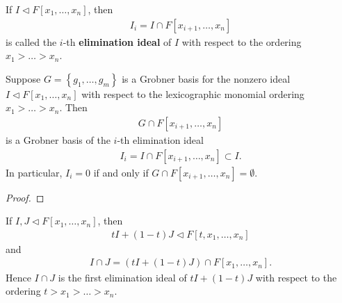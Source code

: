 \documentclass{memoir}
\begin{document}
\begin{defn}
	If \(I\triangleleft F[x_1,\ldots,x_n]\), then
	\begin{align*}
		I_i = I \cap F[x_{i+1},\ldots,x_n]
	\end{align*}
	is called the \(i\)-th \textbf{elimination ideal} of \(I\) with respect to the ordering \(x_1>\ldots>x_n\).
\end{defn}

\begin{prop}[Elimination]
	Suppose \(G = \left\{ g_1,\ldots,g_m \right\} \) is a Grobner basis for the nonzero ideal \(I \triangleleft F[x_1,\ldots,x_n]\) with respect to the lexicographic monomial ordering \(x_1>\ldots>x_n\). Then
	\begin{align*}
		G \cap F[x_{i+1},\ldots,x_n]
	\end{align*}
	is a Grobner basis of the \(i\)-th elimination ideal
	\begin{align*}
		I_i = I \cap F[x_{i+1},\ldots,x_n] \subset I.
	\end{align*}
	In particular, \(I_i = 0\) if and only if \(G \cap F[x_{i+1},\ldots,x_n] = \emptyset\).
\end{prop}
\begin{proof}
	
\end{proof}

\begin{exmp}
		
\end{exmp}

\begin{prop}
	If \(I,J \triangleleft F[x_1,\ldots,x_n]\), then
	\begin{align*}
		tI + (1-t)J \triangleleft F[t,x_1,\ldots,x_n]
	\end{align*}
	and
	\begin{align*}
		I \cap J = (tI + (1-t)J) \cap F[x_1,\ldots,x_n].
	\end{align*}
	Hence \(I\cap J\) is the first elimination ideal of \(tI + (1-t)J\) with respect to the ordering \(t > x_1 > \ldots > x_n\).
\end{prop}

\end{document}
